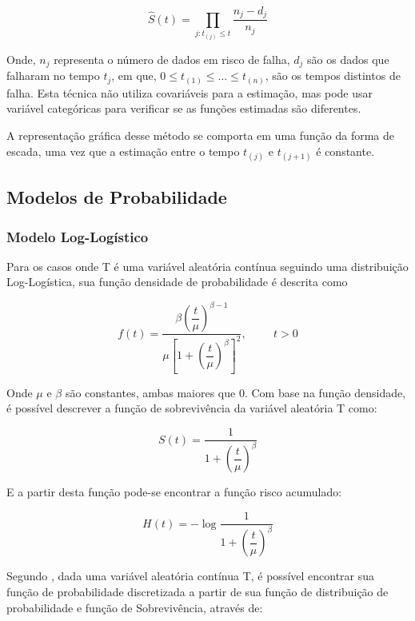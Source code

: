 \documentclass[
	article,
	12pt,				%
	openright,			%
	twoside,			%
	a4paper,			%
	english,			%
	french,				%
	spanish,			%
	brazil				%
	]{abntex2}
\begin{document}
$$ \hat{S}(t) = \prod_{j:t_{(j)}\le t} \dfrac{n_j - d_j}{n_j}$$

Onde, $n_j$ representa o número de dados em risco de falha, $d_j$ são os dados que falharam no tempo $t_j$, em que, $0 \le t_{(1)} \le \hdots \le t_{(n)}$, são os tempos distintos de falha. Esta técnica não utiliza covariáveis para a estimação, mas pode usar variável categóricas para verificar se as funções estimadas são diferentes. 

A representação gráfica desse método se comporta em uma função da forma de escada, uma vez que a estimação entre o tempo $t_{(j)}$ e $t_{(j+1)}$ é constante.
\subsection{Modelos de Probabilidade}

\subsubsection{Modelo Log-Logístico}

Para os casos onde T é uma variável aleatória contínua seguindo uma distribuição Log-Logística, sua função densidade de probabilidade é descrita como

\begin{equation}
  f(t) = \dfrac{\beta\left(\dfrac{t}{\mu}\right)^{\beta - 1}}{\mu\left[1+\left(\dfrac{t}{\mu}\right)^{\beta}\right]^2}, \hspace{1cm} t > 0
\end{equation}

Onde $\mu$ e $\beta$ são constantes, ambas maiores que 0. Com base na função densidade, é possível descrever a função de sobrevivência da variável aleatória T como:

\begin{equation} \label{eq: LLSurv}
  S(t) = \dfrac{1}{1 + \left(\dfrac{t}{\mu}\right)^{\beta}}
\end{equation}

E a partir desta função pode-se encontrar a função risco acumulado:

\begin{equation} \label{eq: HazLL}
H(t) = - \log{\dfrac{1}{1 + \left(\dfrac{t}{\mu}\right)^{\beta}}}
\end{equation}

Segundo \cite{damiao;2017}, dada uma variável aleatória contínua T, é possível encontrar sua função de probabilidade discretizada a partir de sua função de distribuição de probabilidade e função de Sobrevivência, através de:
\end{document}
